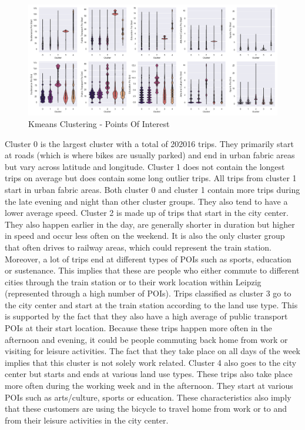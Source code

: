 \begin{figure}[htp]
    \centering
    \includegraphics[width=1\textwidth]{figures/Clustering/clusters_sustenance_poi_start.png}
    \caption{Kmeans Clustering - Points Of Interest}
    \label{fig:kmeans_poi}
\end{figure}


Cluster 0 is the largest cluster with a total of 202016 trips. They primarily start at roads (which is where bikes are usually parked) and end in urban fabric areas but vary across latitude and longitude. Cluster 1 does not contain the longest trips on average but does contain some long outlier trips. All trips from cluster 1 start in urban fabric areas. Both cluster 0 and cluster 1 contain more trips during the late evening and night than other cluster groups. They also tend to have a lower average speed. Cluster 2 is made up of trips that start in the city center. They also happen earlier in the day, are generally shorter in duration but higher in speed and occur less often on the weekend. It is also the only cluster group that often drives to railway areas, which could represent the train station. Moreover, a lot of trips end at different types of POIs such as sports, education or sustenance. This implies that these are people who either commute to different cities through the train station or to their work location within Leipzig (represented through a high number of POIs). Trips classified as cluster 3 go to the city center and start at the train station according to the land use type. This is supported by the fact that they also have a high average of public transport POIs at their start location. Because these trips happen more often in the afternoon and evening, it could be people commuting back home from work or visiting for leisure activities. The fact that they take place on all days of the week implies that this cluster is not solely work related. Cluster 4 also goes to the city center but starts and ends at various land use types. These trips also take place more often during the working week and in the afternoon. They start at various POIs such as arts/culture, sports or education. These characteristics also imply that these customers are using the bicycle to travel home from work or to and from their leisure activities in the city center.
